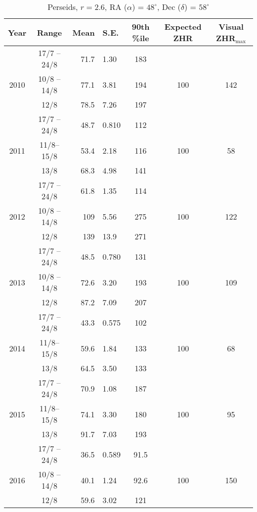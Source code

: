 \begin{table}[h!]
	\centering
	\begin{tabular}{|c|c|r@{ \,$\pm$\, }lc|cc|}
		\hline 
		Year & Range & Mean & S.E. & 90th \%ile & Expected ZHR & Visual ZHR$_{\text{max}}$ \\ 
		\hline	
		& 17/7 -- 24/8 & 71.7 & 1.30 & 183 & & \\ 
		2010 & 10/8 -- 14/8&	77.1 & 3.81 & 194   & 100 &142 \\ 
		& 12/8& 78.5 & 7.26 & 197   & & \\ 
		\hline 
		& 17/7 -- 24/8& 48.7 & 0.810 & 112   & & \\ 
		2011 & 11/8--15/8& 53.4 & 2.18 & 116   &100  &58 \\ 
		& 13/8& 68.3 & 4.98 & 141   & & \\ 
		\hline 
		& 17/7 -- 24/8& 61.8 & 1.35 & 114   & & \\ 
		2012 &10/8 -- 14/8 & 109 & 5.56 & 275   & 100& 122\\ 
		& 12/8& 139 & 13.9 & 271   & & \\ 
		\hline 
		&17/7 -- 24/8 & 48.5 & 0.780 & 131   & & \\ 
		2013 &10/8 -- 14/8 & 72.6 & 3.20 & 193   &100 &109 \\ 
		&12/8 & 87.2 & 7.09 & 207   & & \\ 
		\hline 
		& 17/7 -- 24/8& 43.3 & 0.575 & 102   & & \\ 
		2014 & 11/8--15/8& 59.6 & 1.84 & 133   & 100&68 \\ 
		& 13/8& 64.5 & 3.50 & 133  & & \\ 
		\hline 
		&17/7 -- 24/8 & 70.9 & 1.08 & 187   & & \\ 
		2015 &11/8--15/8 & 74.1 & 3.30 & 180   &100 &95 \\ 
		& 13/8& 91.7 & 7.03 & 193   & & \\ 
		\hline
		&17/7 -- 24/8 & 36.5 & 0.589 & 91.5	& & \\
		2016 & 10/8 -- 14/8& 40.1 & 1.24 & 92.6   & 100&150 \\ 
		& 12/8& 59.6 & 3.02 & 121   & & \\ 
		\hline 
	\end{tabular}
	\caption{Perseids, $r=2.6$, RA ($\alpha$) = $48^{\circ}$, Dec ($\delta$) = $58^{\circ}$} 
\end{table}

